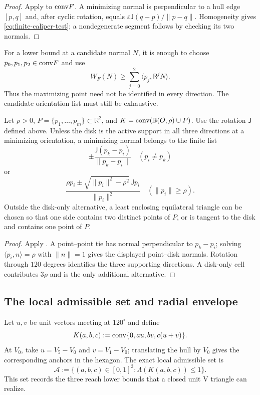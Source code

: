 \begin{proof}
Apply 
to $\mathrm{conv} F$. A minimizing normal is perpendicular to a hull edge
$[p,q]$ and, after cyclic
rotation, equals
$\varepsilon\mathsf J(q-p)/\lVert p-q\rVert$.  Homogeneity gives
\eqref{eq:finite-caliper-test}; a nondegenerate segment follows by checking
its two normals.

\end{proof}

For a lower bound at a candidate normal $N$, it is enough to choose
$p_0,p_1,p_2\in\mathrm{conv} F$ and use
\[
 W_F(N)\ge\sum_{j=0}^2\langle p_j,\mathsf R^jN\rangle.
\]
Thus the maximizing point need not be identified in every direction.
The candidate orientation list must still be exhaustive.

\begin{proposition}
\label{prop:new-disk-finite-caliper}
Let $\rho>0$, $P=\{p_1,\ldots,p_m\}\subset\mathbb R^2$, and
$K=\mathrm{conv}(\mathbb B(O,\rho)\cup P)$. Use the rotation $\mathsf J$
defined above. Unless the disk is the active support in all three directions at a minimizing
orientation, a minimizing normal belongs to the finite list
\[
 \pm\frac{\mathsf J(p_k-p_i)}{\|p_k-p_i\|}
 \quad(p_i\ne p_k)
\]
or
\[
 \frac{\rho p_i\pm
 \sqrt{\|p_i\|^2-\rho^2}\,\mathsf Jp_i}{\|p_i\|^2}
 \quad(\|p_i\|\ge\rho).
\]
Outside the disk-only alternative, a least enclosing equilateral triangle
can be chosen so that one side contains two distinct points of $P$, or is
tangent to the disk and contains one point of $P$.
\end{proposition}

\begin{proof}
Apply . A point--point tie has normal
perpendicular to $p_k-p_i$; solving $\langle p_i,n\rangle=\rho$ with
$\|n\|=1$ gives the displayed point--disk normals. Rotation through
$120$ degrees identifies the three supporting directions. A disk-only
cell contributes $3\rho$ and is the only additional alternative.
\end{proof}

\subsection{The local admissible set and radial envelope}
\label{sec:admissible-set-derivation}

Let $u,v$ be unit vectors meeting at $120^\circ$ and define
\[
 K(a,b,c):=\mathrm{conv}\{0,au,bv,c(u+v)\}.
\]
At $V_0$, take $u=V_5-V_0$ and $v=V_1-V_0$; translating the
hull by $V_0$ gives the corresponding anchors in the hexagon.
The exact local admissible set is
\begin{equation}
 \mathcal A:=
 \{(a,b,c)\in[0,1]^3:\Lambda(K(a,b,c))\le1\}.
 \label{eq:universal-admissible-gauge}
\end{equation}
This set records the three reach lower bounds that a closed unit V triangle
can realize.

